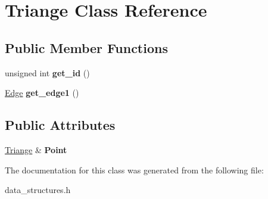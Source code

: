 \hypertarget{class_triange}{}\section{Triange Class Reference}
\label{class_triange}
\subsection*{Public Member Functions}
\begin{DoxyCompactItemize}
\item 
\hypertarget{class_triange_a10848c55f611cc358d56eef44d979737}{}unsigned int {\bfseries get\+\_\+id} ()\label{class_triange_a10848c55f611cc358d56eef44d979737}

\item 
\hypertarget{class_triange_a18b86b3c8470e1d24f4a0e49252aa7f4}{}\hyperlink{class_edge}{Edge} {\bfseries get\+\_\+edge1} ()\label{class_triange_a18b86b3c8470e1d24f4a0e49252aa7f4}

\end{DoxyCompactItemize}
\subsection*{Public Attributes}
\begin{DoxyCompactItemize}
\item 
\hypertarget{class_triange_a9b3d3474a48b1aa6175925def87ae9c6}{}\hyperlink{class_triange}{Triange} \& {\bfseries Point}\label{class_triange_a9b3d3474a48b1aa6175925def87ae9c6}

\end{DoxyCompactItemize}


The documentation for this class was generated from the following file\+:\begin{DoxyCompactItemize}
\item 
data\+\_\+structures.\+h\end{DoxyCompactItemize}
